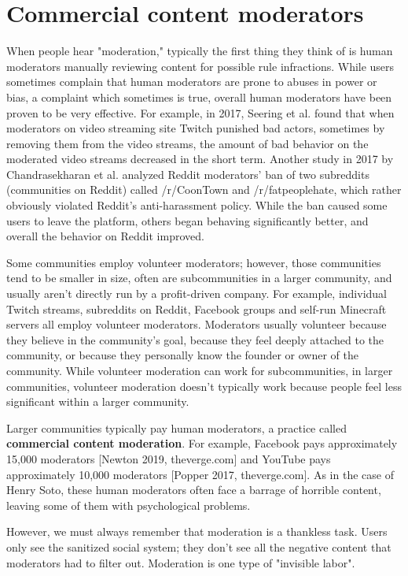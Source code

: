 \documentclass[class=book, crop=false]{standalone}
\providecommand{\keyterm}[1]{\textbf{#1}\marginnote{\scriptsize \textbf{#1}}}
\begin{document}
\section{Commercial content moderators}

When people hear "moderation," typically the first thing they think of is human moderators manually reviewing content for possible rule infractions. While users sometimes complain that human moderators are prone to abuses in power or bias, a complaint which sometimes is true, overall human moderators have been proven to be very effective. For example, in 2017, Seering et al. found that when moderators on video streaming site Twitch punished bad actors, sometimes by removing them from the video streams, the amount of bad behavior on the moderated video streams decreased in the short term. Another study in 2017 by Chandrasekharan et al. analyzed Reddit moderators' ban of two subreddits (communities on Reddit) called /r/CoonTown and /r/fatpeoplehate, which rather obviously violated Reddit's anti-harassment policy. While the ban caused some users to leave the platform, others began behaving significantly better, and overall the behavior on Reddit improved.

Some communities employ volunteer moderators; however, those communities tend to be smaller in size, often are subcommunities in a larger community, and usually aren't directly run by a profit-driven company. For example, individual Twitch streams, subreddits on Reddit, Facebook groups and self-run Minecraft servers all employ volunteer moderators. Moderators usually volunteer because they believe in the community's goal, because they feel deeply attached to the community, or because they personally know the founder or owner of the community. While volunteer moderation can work for subcommunities, in larger communities, volunteer moderation doesn't typically work because people feel less significant within a larger community.

Larger communities typically pay human moderators, a practice called \keyterm{commercial content moderation}. For example, Facebook pays approximately 15,000 moderators [Newton 2019, theverge.com] and YouTube pays approximately 10,000 moderators [Popper 2017, theverge.com]. As in the case of Henry Soto, these human moderators often face a barrage of horrible content, leaving some of them with psychological problems.

However, we must always remember that moderation is a thankless task. Users only see the sanitized social system; they don't see all the negative content that moderators had to filter out. Moderation is one type of "invisible labor".
\end{document}
